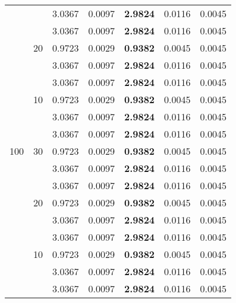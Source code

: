 \begin{table}[H]
{\begin{tabular}{c c | C{2.4cm} | C{2.4cm} | C{2.4cm} | C{2.4cm} | C{2.4cm} }
			&&3.0367&0.0097&\textbf{2.9824}&0.0116&0.0045\\
			&&3.0367&0.0097&\textbf{2.9824}&0.0116&0.0045\\
			&20&0.9723&0.0029&\textbf{0.9382}&0.0045&0.0045\\
			&&3.0367&0.0097&\textbf{2.9824}&0.0116&0.0045\\
			&&3.0367&0.0097&\textbf{2.9824}&0.0116&0.0045\\
			&10&0.9723&0.0029&\textbf{0.9382}&0.0045&0.0045\\
			&&3.0367&0.0097&\textbf{2.9824}&0.0116&0.0045\\
			&&3.0367&0.0097&\textbf{2.9824}&0.0116&0.0045\\
			\cmidrule(lr){1-7}
			100&30&0.9723&0.0029&\textbf{0.9382}&0.0045&0.0045\\
			&&3.0367&0.0097&\textbf{2.9824}&0.0116&0.0045\\
			&&3.0367&0.0097&\textbf{2.9824}&0.0116&0.0045\\
			&20&0.9723&0.0029&\textbf{0.9382}&0.0045&0.0045\\
			&&3.0367&0.0097&\textbf{2.9824}&0.0116&0.0045\\
			&&3.0367&0.0097&\textbf{2.9824}&0.0116&0.0045\\
			&10&0.9723&0.0029&\textbf{0.9382}&0.0045&0.0045\\
			&&3.0367&0.0097&\textbf{2.9824}&0.0116&0.0045\\
			&&3.0367&0.0097&\textbf{2.9824}&0.0116&0.0045\\
			\bottomrule[1.5pt]
	\end{tabular}}
	\label{table:table S.1}
\end{table}

